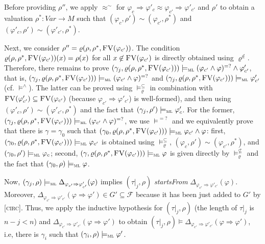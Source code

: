 \documentclass[conference]{IEEEtran}
\newcommand{\M}{\mathit{M}}
\newcommand{\F}{\mathcal{F}}
\newcommand{\Ra}{\Rightarrow}
\newcommand{\Var}{\mathit{Var}}
\newcommand{\FreeVars}{\mathit{\textsc{FV}}}
\newcommand{\ML}{\textsc{ml}\xspace}
\newcommand{\rrule}[2]{{#1} \Ra{#2}}
\newcommand{\modelsml}{\models_\ML}
\newcommand{\coq}[1]{{\small \textit{#1}}}
\newcommand{\extend}[3]{\varrho({#1},{#2},{#3})}
\begin{document}
\begin{itemize}
\begin{enumerate}
{{Before providing $\rho''$, we apply $\approx^\sim$ for $\rrule{\varphi_c}{\varphi'_c} \approx \rrule{\varphi_{c'}}{\varphi'_{c'}}$ and $\rho'$ to obtain a valuation $\rho^*:\Var \to \M$ such that $(\varphi_c, \rho') \sim (\varphi_{c'}, \rho^*)$ and $(\varphi'_c, \rho') \sim (\varphi'_{c'}, \rho^*)$. 

Next, we consider $\rho'' = \extend{\rho}{\rho^*}{\FreeVars(\varphi_{c'})}$. 
The condition $\extend{\rho}{\rho^*}{\FreeVars(\varphi_{c'})}(x) = \rho(x)$ for all $x \not\in \FreeVars(\varphi_{c'})$ is directly obtained using $\varrho^{\not\in}$.
Therefore, there remains to prove $(\gamma_j, \extend{\rho}{\rho^*}{\FreeVars(\varphi_{c'})}) \modelsml (\varphi_{c'} \land \varphi)^{=?} \land \varphi'_{c'}$, that is, $(\gamma_j, \extend{\rho}{\rho^*}{\FreeVars(\varphi_{c'})}) \modelsml (\varphi_{c'} \land \varphi)^{=?}$ and 
$(\gamma_j, \extend{\rho}{\rho^*}{\FreeVars(\varphi_{c'})}) \modelsml \varphi'_{c'}$ (cf. $\models^{\land}$).
The latter can be proved using $\models_{\varrho}^\subseteq$ in combination with $\FreeVars(\varphi'_{c'}) \subseteq \FreeVars(\varphi_{c'})$ (because $\rrule{\varphi_{c'}}{\varphi'_{c'}}$) is well-formed), and then using $(\varphi'_c, \rho') \sim (\varphi'_{c'}, \rho^*)$ and the fact that  $(\gamma_j, \rho') \modelsml \varphi'_c$.
For the former,  $(\gamma_j, \extend{\rho}{\rho^*}{\FreeVars(\varphi_{c'})}) \modelsml (\varphi_{c'} \land \varphi)^{=?}$, we use $\models^{=?}$ and we equivalently prove that there is $\gamma = \gamma_0$ such that $(\gamma_0, \extend{\rho}{\rho^*}{\FreeVars(\varphi_{c'})}) \modelsml \varphi_{c'} \land \varphi$: first, $(\gamma_0, \extend{\rho}{\rho^*}{\FreeVars(\varphi_{c'})}) \modelsml \varphi_{c'}$ is obtained using $\models_{\varrho}^\subseteq$, $(\varphi_c, \rho') \sim (\varphi_{c'}, \rho^*)$, and $(\gamma_0, \rho') \modelsml  \varphi_{c}$; 
second, $(\gamma, \extend{\rho}{\rho^*}{\FreeVars(\varphi_{c'})}) \modelsml \varphi$ is given directly by $\models_{\varrho}^{\not\subseteq}$ and the fact that $(\gamma_0, \rho) \modelsml  \varphi$.
}}

Now, $(\gamma_j, \rho) \modelsml \Delta_{\rrule{\varphi_{c'}}{\varphi'_{c'}}}(\varphi)$ implies $(\tau|_j, \rho)$ \coq{startsFrom} $\Delta_{\rrule{\varphi_{c'}}{\varphi'_{c'}}}(\varphi)$. 
Moreover, $\Delta_{\rrule{\varphi_{c'}}{\varphi'_{c'}}}(\rrule{\varphi}{\varphi'}) \in G'\subseteq \F$ because it has been just added to $G'$ by [\textsc{circ}].
Thus, we apply the inductive hypothesis for $(\tau|_j, \rho)$ (the length of $\tau|_j$ is $n-j < n$) and $\Delta_{\rrule{\varphi_{c'}}{\varphi'_{c'}}}(\rrule{\varphi}{\varphi'})$ to obtain $(\tau|_j, \rho) \models \Delta_{\rrule{\varphi_{c'}}{\varphi'_{c'}}}(\rrule{\varphi}{\varphi'})$, i.e, 
there is $\gamma_i$ such that $(\gamma_i, \rho) \modelsml \varphi'$. 


\end{enumerate}
\end{itemize}
\end{document}
